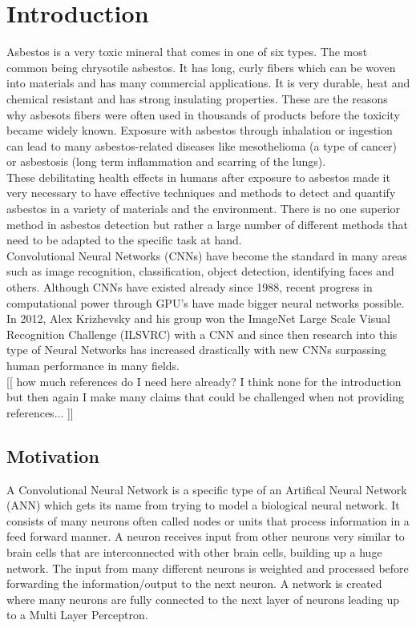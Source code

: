 \chapter{Introduction}

Asbestos is a very toxic mineral that comes in one of six types. The most common being chrysotile asbestos. It has long, curly fibers which can be woven into materials and has many commercial applications. It is very durable, heat and chemical resistant and has strong insulating properties. These are the reasons why asbesots fibers were often used in thousands of products before the toxicity became widely known. Exposure with asbestos through inhalation or ingestion can lead to many asbestos-related diseases like mesothelioma (a type of cancer) or asbestosis (long term inflammation and scarring of the lungs). \\

These debilitating health effects in humans after exposure to asbestos made it very necessary to have effective techniques and methods to detect and quantify asbestos in a variety of materials and the environment. There is no one superior method in asbestos detection but rather a large number of different methods that need to be adapted to the specific task at hand. \\

Convolutional Neural Networks (CNNs) have become the standard in many areas such as image recognition, classification, object detection, identifying faces and others. Although CNNs have existed already since 1988, recent progress in computational power through GPU's have made bigger neural networks possible. In 2012, Alex Krizhevsky and his group won the ImageNet Large Scale Visual Recognition Challenge (ILSVRC) with a CNN and since then research into this type of Neural Networks has increased drastically with new CNNs surpassing human performance in many fields. \\

[[ how much references do I need here already?  I think none for the introduction but then again I make many claims that could be challenged when not providing references... ]]

\section{Motivation}

A Convolutional Neural Network is a specific type of an Artifical Neural Network (ANN) which gets its name from trying to model a biological neural network. It consists of many neurons often called nodes or units that process information in a feed forward manner. A neuron receives input from other neurons very similar to brain cells that are interconnected with other brain cells, building up a huge network. The input from many different neurons is weighted and processed before forwarding the information/output to the next neuron. A network is created where many neurons are fully connected to the next layer of neurons leading up to a Multi Layer Perceptron. \\

